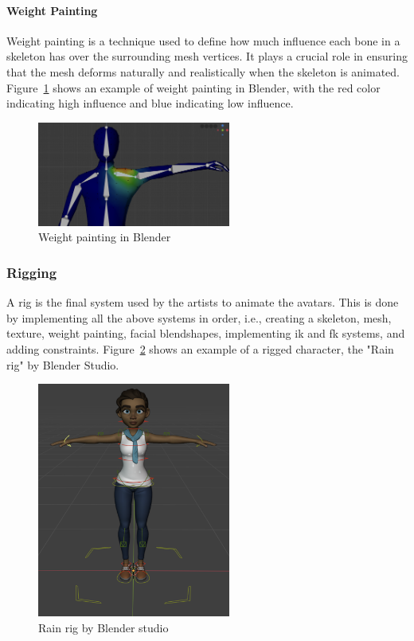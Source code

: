 \documentclass[../../main.tex]{subfiles}
\begin{document}
\paragraph{Weight Painting}
\label{ch:background_work:sign_language_synthesis:3d_techniques:mesh_and_texture:weight_painting}

Weight painting is a technique used to define how much influence each bone in a skeleton has over the surrounding mesh vertices. It plays a crucial role in ensuring that the mesh deforms naturally and realistically when the skeleton is animated. Figure~\ref{fig:weight_painting} shows an example of weight painting in Blender, with the red color indicating high influence and blue indicating low influence.

\begin{figure} 
  \centering \includegraphics[width = 2.5in]{chapters/background_work/images/weight_painting.png} 
  \caption{Weight painting in Blender} 
  \label{fig:weight_painting} 
\end{figure}

\subsubsection{Rigging}
\label{ch:background_work:sign_language_synthesis:3d_techniques:rigging}

A rig is the final system used by the artists to animate the avatars. This is done by implementing all the above systems in order, i.e., creating a skeleton, mesh, texture, weight painting, facial blendshapes, implementing \gls{ik} and \gls{fk} systems, and adding constraints. Figure~\ref{fig:rig_example} shows an example of a rigged character, the "Rain rig" by Blender Studio.

\begin{figure} 
  \centering \includegraphics[width = 2.5in]{chapters/background_work/images/rig_example.png} 
  \caption{Rain rig by Blender studio} 
  \label{fig:rig_example} 
\end{figure}
\end{document}
